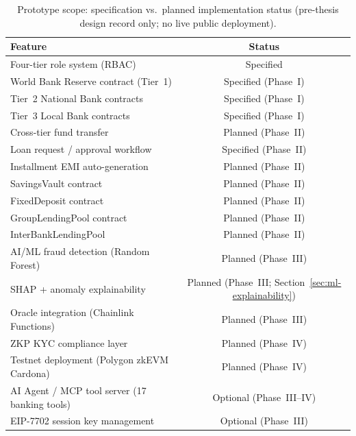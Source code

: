 \documentclass[12pt,a4paper]{report}
\newcommand{\tmarkPartial}{\faHourglassHalf}
\newcommand{\tmarkPlanned}{\textcolor{black!55}{\faCircle}}
\newcommand{\tableheadcolor}{\rowcolor{TableHeadBg}}
\newcommand{\tableheadfont}{\bfseries}
\begin{document}
\begin{table}[H]
\centering
\caption[Prototype scope and implementation status]{Prototype scope: specification vs.\ planned implementation status (pre-thesis design record only; no live public deployment).}
\label{tab:prototype-scope}
\begin{tabular}{@{}p{7.5cm}c@{}}
\toprule
\tableheadcolor
\tableheadfont Feature & \tableheadfont Status \\
\midrule
Four-tier role system (RBAC) & \tmarkPartial{} Specified \\
\rowcolor{RowShade}
World Bank Reserve contract (Tier~1) & \tmarkPartial{} Specified (Phase~I) \\
Tier~2 National Bank contracts & \tmarkPartial{} Specified (Phase~I) \\
\rowcolor{RowShade}
Tier~3 Local Bank contracts & \tmarkPartial{} Specified (Phase~I) \\
Cross-tier fund transfer & \tmarkPlanned{} Planned (Phase~II) \\
\rowcolor{RowShade}
Loan request / approval workflow & \tmarkPartial{} Specified (Phase~II) \\
Installment EMI auto-generation & \tmarkPlanned{} Planned (Phase~II) \\
\rowcolor{RowShade}
SavingsVault contract & \tmarkPlanned{} Planned (Phase~II) \\
FixedDeposit contract & \tmarkPlanned{} Planned (Phase~II) \\
\rowcolor{RowShade}
GroupLendingPool contract & \tmarkPlanned{} Planned (Phase~II) \\
InterBankLendingPool & \tmarkPlanned{} Planned (Phase~II) \\
\rowcolor{RowShade}
AI/ML fraud detection (Random Forest) & \tmarkPlanned{} Planned (Phase~III) \\
SHAP + anomaly explainability & \tmarkPlanned{} Planned (Phase~III; Section~\ref{sec:ml-explainability}) \\
\rowcolor{RowShade}
Oracle integration (Chainlink Functions) & \tmarkPlanned{} Planned (Phase~III) \\
ZKP KYC compliance layer & \tmarkPlanned{} Planned (Phase~IV) \\
\rowcolor{RowShade}
Testnet deployment (Polygon zkEVM Cardona) & \tmarkPlanned{} Planned (Phase~IV) \\
AI Agent / MCP tool server (17 banking tools) & \tmarkPlanned{} Optional (Phase~III--IV) \\
\rowcolor{RowShade}
EIP-7702 session key management & \tmarkPlanned{} Optional (Phase~III) \\

\end{tabular}
\end{table}
\end{document}
